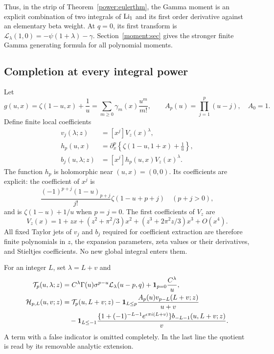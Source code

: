 Thus, in the strip of Theorem~\ref{power:eulerthm}, the Gamma moment
is an explicit combination of two integrals of $\operatorname{Li}_1$ and its first
order derivative against an elementary beta weight.  At $q=0$, its
first transform is $\mathcal L_\lambda(1,0)=-\psi(1+\lambda)-\gamma$.
Section~\ref{moment:sec} gives the stronger finite Gamma generating
formula for all polynomial moments.

\subsection{Completion at every integral power}

Let
\begin{equation}\label{power:stieltjes}
 g(u,x)=\zeta(1-u,x)+\frac1u
     =\sum_{m\ge0}\gamma_m(x)\frac{u^m}{m!},\qquad
 A_p(u)=\prod_{j=1}^p(u-j),\quad A_0=1.
\end{equation}
Define finite local coefficients
\begin{align}
 v_j(\lambda;z)&=[x^j]V_z(x)^\lambda,\label{power:vj}\\
 h_p(u,x)&=\partial_x^p\left\{\zeta(1-u,1+x)+\frac1u\right\},
        \label{power:hp}\\
 b_j(u,\lambda;z)&=[x^j]h_p(u,x)V_z(x)^\lambda.
        \label{power:bj}
\end{align}
The function $h_p$ is holomorphic near $(u,x)=(0,0)$.  Its coefficients
are explicit: the coefficient of $x^j$ is
\begin{equation}\label{power:hcoeff}
 \frac{(-1)^{p+j}(1-u)_{p+j}}{j!}\zeta(1-u+p+j)
 \quad(p+j>0),
\end{equation}
and is $\zeta(1-u)+1/u$ when $p=j=0$.
The first coefficients of $V_z$ are
\[
 V_z(x)=1+zx+(z^2+\pi^2/3)x^2
                   +(z^3+2\pi^2z/3)x^3+O(x^4).
\]
All fixed Taylor jets of $v_j$ and $b_j$ required for coefficient
extraction are therefore finite polynomials in $z$, the expansion
parameters, zeta values or their derivatives, and Stieltjes
coefficients.  No new global integral enters them.

For an integer $L$, set $\lambda=L+v$ and
\begin{align}
 \mathcal T_p(u,\lambda;z)
   &=C^\lambda\Gamma(u)\sigma^{p-u}
                    \mathcal L_\lambda(u-p,q)
         +\mathbf1_{p=0}\frac{C^\lambda}{u},\label{power:T}\\
 \mathcal H_{p,L}(u,v;z)
   &=\mathcal T_p(u,L+v;z)
      -\mathbf1_{L\le p}
        \frac{A_p(u)v_{p-L}(L+v;z)}{u+v}\notag\\
   &\quad-\mathbf1_{L\le-1}
       \frac{\{1+(-1)^{-L-1}e^{\epsilon\pi i(L+v)}\}
                    b_{-L-1}(u,L+v;z)}{v}.
       \label{power:H}
\end{align}
A term with a false indicator is omitted completely.  In the last
line the quotient is read by its removable analytic extension.

